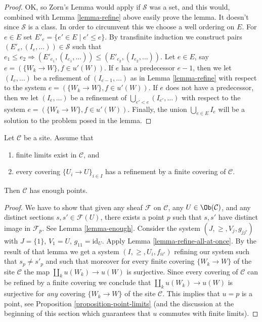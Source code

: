 \begin{proof}
\medskip\noindent
OK, so Zorn's Lemma would apply if $\mathcal{S}$ was a set,
and this would, combined with Lemma \ref{lemma-refine} above easily prove
the lemma. It doesn't since $\mathcal{S}$ is a class. In order
to circumvent this we choose a well ordering on $E$.
For $e \in E$ set $E'_e = \{e' \in E \mid e' \leq e\}$.
By transfinite induction we construct pairs
$(E'_e, (I_e, \ldots)) \in \mathcal{S}$ such that
$e_1 \leq e_2 \Rightarrow (E'_{e_1}, (I_{e_1}, \ldots))
\leq (E'_{e_2}, (I_{e_2}, \ldots))$.
Let $e \in E$, say $e = (\{W_k \to W\}, f\in u'(W))$.
If $e$ has a predecessor $e - 1$, then we let
$(I_e, \ldots)$ be a refinement of $(I_{e - 1}, \ldots)$
as in Lemma \ref{lemma-refine} with respect to the system
$e = (\{W_k \to W\}, f\in u'(W))$.
If $e$ does not have a predecessor, then we let
$(I_e, \ldots)$ be a refinement of $\bigcup_{e' < e} (I_{e'}, \ldots)$
with respect to the system
$e = (\{W_k \to W\}, f\in u'(W))$.
Finally, the union $\bigcup_{e \in E} I_e$ will be a solution to
the problem posed in the lemma.
\end{proof}

\begin{proposition}
\label{proposition-criterion-points}
\begin{reference}
\cite[Expos\'e VI, Appendix by Deligne, Proposition 9.0]{SGA4}
\end{reference}
Let $\mathcal{C}$ be a site. Assume that
\begin{enumerate}
\item finite limits exist in $\mathcal{C}$, and
\item every covering $\{U_i \to U\}_{i \in I}$
has a refinement by a finite covering of $\mathcal{C}$.
\end{enumerate}
Then $\mathcal{C}$ has enough points.
\end{proposition}

\begin{proof}
We have to show that given any sheaf
$\mathcal{F}$ on $\mathcal{C}$, any $U \in \Ob(\mathcal{C})$,
and any distinct sections $s, s' \in \mathcal{F}(U)$, there exists
a point $p$ such that $s, s'$ have distinct image in
$\mathcal{F}_p$. See Lemma \ref{lemma-enough}.
Consider the system $(J, \geq, V_j, g_{jj'})$
with $J = \{1\}$, $V_1 = U$, $g_{11} = \text{id}_U$.
Apply Lemma \ref{lemma-refine-all-at-once}.
By the result of that lemma we get a system
$(I, \geq, U_i, f_{ii'})$ refining our system such
that $s_p \not = s'_p$ and such that moreover for every
finite covering $\{W_k \to W\}$ of the site $\mathcal{C}$ the map
$\coprod_k u(W_k) \to u(W)$ is surjective.
Since every covering of $\mathcal{C}$ can be refined by
a finite covering we conclude that
$\coprod_k u(W_k) \to u(W)$ is surjective for {\it any}
covering $\{W_k \to W\}$ of the site $\mathcal{C}$.
This implies that $u = p$ is a point, see
Proposition \ref{proposition-point-limits} (and the discussion
at the beginning of this section which guarantees that $u$
commutes with finite limits).
\end{proof}

